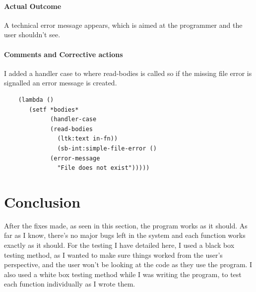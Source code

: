 \paragraph{Actual Outcome}
A technical error message appears, which is aimed at the programmer and the user
shouldn't see.
\paragraph{Comments and Corrective actions}
I added a handler case to where read-bodies is called so if the missing file
error is signalled an error message is created.
\begin{lstlisting}
	(lambda () 
	   (setf *bodies* 
	         (handler-case 
		     (read-bodies 
		       (ltk:text in-fn))
	           (sb-int:simple-file-error ()
		     (error-message
		       "File does not exist")))))
\end{lstlisting}

\section{Conclusion}

After the fixes made, as seen in this section, the program works as it should.
As far as I know, there's no major bugs left in the system and each function
works exactly as it should. For the testing I have detailed here, I used a black
box testing method, as I wanted to make sure things worked from the user's
perspective, and the user won't be looking at the code as they use the program.
I also used a white box testing method while I was writing the program, to test
each function individually as I wrote them. 

